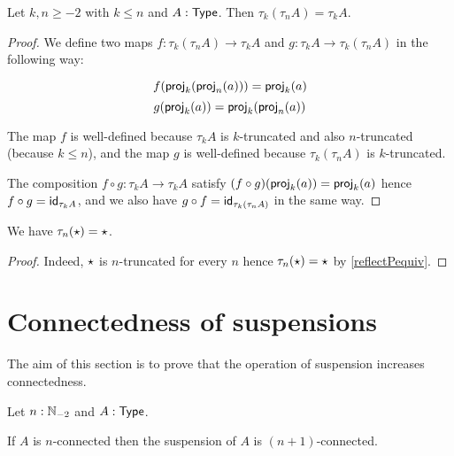 \begin{lem}
  Let $k,n\ge-2$ with $k\le{}n$ and $A:\type$. Then
  $\tau_k(\tau_nA)=\tau_kA$.
\end{lem}
\begin{proof}
  We define two maps $f:\tau_k(\tau_nA)\to\tau_kA$ and
  $g:\tau_kA\to\tau_k(\tau_nA)$ in the following way:

  \[f(\tproj_k(\tproj_n(a)))=\tproj_k(a)\]
  \[g(\tproj_k(a))=\tproj_k(\tproj_n(a))\]

  The map $f$ is well-defined because $\tau_kA$ is $k$-truncated and also
  $n$-truncated (because $k\le{}n$), and the map $g$ is well-defined because
  $\tau_k(\tau_nA)$ is $k$-truncated.

  The composition $f\circ{}g:\tau_kA\to\tau_kA$ satisfy
  $(f\circ{}g)(\tproj_k(a))=\tproj_k(a)$ hence $f\circ{}g=\idfunc[\tau_kA]$, and
  we also have $g\circ{}f=\idfunc[\tau_k(\tau_nA)]$ in the same way.
\end{proof}

\begin{lem}
  We have $\tau_n(\unit)=\unit$.
\end{lem}
\begin{proof}
  Indeed, $\unit$ is $n$-truncated for every $n$ hence $\tau_n(\unit)=\unit$ by
  \autoref{reflectPequiv}.
\end{proof}

\section{Connectedness of suspensions}

The aim of this section is to prove that the operation of suspension increases
connectedness.

\begin{thm}
  Let $n:\Nt$ and $A:\type$.

  If $A$ is $n$-connected then the suspension of $A$ is $(n+1)$-connected.
\end{thm}

